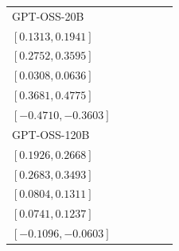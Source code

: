 \begin{tabular*}{\linewidth}{@{\extracolsep{\fill}}lccccc@{}}
GPT-OSS-20B & \begin{tabular}[t]{@{}c@{}}\(0.1621\)\\\([0.1313,0.1941]\)\end{tabular} & \begin{tabular}[t]{@{}c@{}}\(0.3172\)\\\([0.2752,0.3595]\)\end{tabular} & \begin{tabular}[t]{@{}c@{}}\(0.0466\)\\\([0.0308,0.0636]\)\end{tabular} & \begin{tabular}[t]{@{}c@{}}\(0.4224\)\\\([0.3681,0.4775]\)\end{tabular} & \begin{tabular}[t]{@{}c@{}}\(-0.4155\)\\\([-0.4710,-0.3603]\)\end{tabular}\\[2pt]
GPT-OSS-120B & \begin{tabular}[t]{@{}c@{}}\(0.2293\)\\\([0.1926,0.2668]\)\end{tabular} & \begin{tabular}[t]{@{}c@{}}\(0.3086\)\\\([0.2683,0.3493]\)\end{tabular} & \begin{tabular}[t]{@{}c@{}}\(0.1052\)\\\([0.0804,0.1311]\)\end{tabular} & \begin{tabular}[t]{@{}c@{}}\(0.0983\)\\\([0.0741,0.1237]\)\end{tabular} & \begin{tabular}[t]{@{}c@{}}\(-0.0845\)\\\([-0.1096,-0.0603]\)\end{tabular}\\[2pt]
\bottomrule
\end{tabular*}
\endgroup
